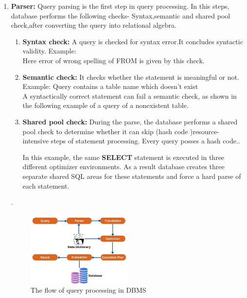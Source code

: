 \begin{enumerate}
\item \textbf{Parser:} Query parsing is the first step in query processing. In this steps, database performs the following checks- Syntax,semantic and shared pool check,after converting the query into relational algebra.\\
    \begin{enumerate}
        \item \textbf{Syntax check:} A query is checked for syntax error.It concludes syntactic validity. Example:\\
        
          Here error of wrong spelling of FROM is given by this check.
        \item \textbf{Semantic check:} It checks whether the statement is meaningful or not. Example: Query contains a table name which doesn't exist\\
        
        A syntactically correct statement can fail a semantic check, as shown in the following example of a query of a nonexistent table.\cite{Oracle}
        \item \textbf{Shared pool check:} During the parse, the database performs a shared pool check to determine whether it can skip (hash code )resource-intensive steps of statement processing. Every query posses a hash code..
        
        In this example, the same \textbf{SELECT} statement is executed in three different optimizer environments. As a result database creates three separate shared SQL areas for these statements and force a hard parse of each statement.\cite{Oracle}
    \end{enumerate}.\\
\begin{figure}[h]
    \centering
    \includegraphics[width=0.5\textwidth]{Figure/Query processing.jpg}
    \caption{The flow of query processing in DBMS}
    \label{fig:my_image}
\end{figure}
    

\end{enumerate}
